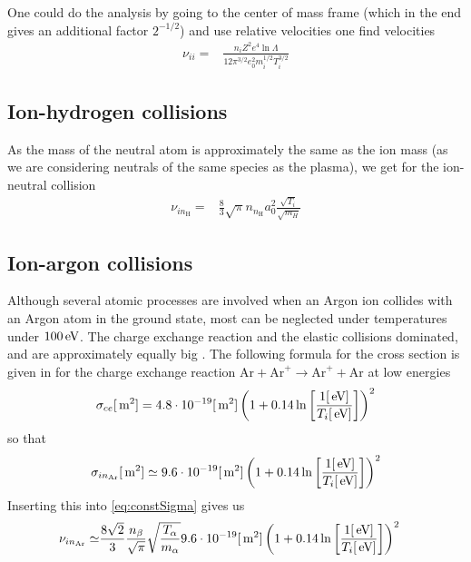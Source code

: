 One could do the analysis by going to the center of mass frame (which in the end gives an additional factor $2^{-1/2}$) and use relative velocities one find velocities
%
\begin{align*}
    \nu_{ii}
    =&
    \frac{n_iZ^2e^4\ln\Lambda}{12\pi^{3/2}e_0^2m_i^{1/2}T_i^{3/2}}
\end{align*}
%

\subsection{Ion-hydrogen collisions}
As the mass of the neutral atom is approximately the same as the ion mass (as we are considering neutrals of the same species as the plasma), we get for the ion-neutral collision
%
\begin{align*}
    \nu_{in_\text{H}}
    =&
    \frac{8}{3} \sqrt{\pi}
    n_{n_\text{H}} a_0^2
    \frac{\sqrt{T_i}}{\sqrt{m_H}}
\end{align*}

\subsection{Ion-argon collisions}
%
Although several atomic processes are involved when an Argon ion collides with an Argon atom in the ground state, most can be neglected under temperatures under $100 \, \text{eV}$.
The charge exchange reaction and the elastic collisions dominated, and are approximately equally big \cite{Lieberman2005}.
The following formula for the cross section is given in \cite{Anders1990} for the charge exchange reaction $\text{Ar}+\text{Ar}^+ \to\text{Ar}^+ +\text{Ar}$ at low energies
%
\begin{align*}
    \sigma_{ce}[\, \text{m}^2] = 4.8\cdot10^{-19}[\, \text{m}^2]\left(1+0.14\ln\left[\frac{1[\, \text{eV}]}{T_i[\, \text{eV}]}\right]\right)^2
\end{align*}
%
so that
%
\begin{align*}
    \sigma_{in_\text{Ar}}[\, \text{m}^2] \simeq 9.6\cdot10^{-19}[\, \text{m}^2]\left(1+0.14\ln\left[\frac{1[\, \text{eV}]}{T_i[\, \text{eV}]}\right]\right)^2
\end{align*}
%
Inserting this into \cref{eq:constSigma} gives us
%
\begin{align*}
    \nu_{in_\text{Ar}}
    \simeq&
    \frac{8\sqrt{2}}{3}
    \frac{n_\beta }{\sqrt{\pi}}
    \sqrt{ \frac{T_\alpha}{m_\alpha}}
    9.6\cdot10^{-19}[\, \text{m}^2]\left(1+0.14\ln\left[\frac{1[\, \text{eV}]}{T_i[\, \text{eV}]}\right]\right)^2
\end{align*}

